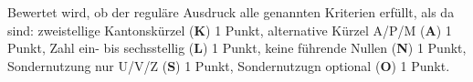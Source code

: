 \begin{bewertung}
Bewertet wird, ob der reguläre Ausdruck alle genannten Kriterien 
erfüllt, als da sind:
zweistellige Kantonskürzel ({\bf K}) 1 Punkt,
alternative Kürzel A/P/M ({\bf A}) 1 Punkt,
Zahl ein- bis sechsstellig ({\bf L}) 1 Punkt,
keine führende Nullen ({\bf N}) 1 Punkt,
Sondernutzung nur U/V/Z ({\bf S}) 1 Punkt,
Sondernutzugn optional ({\bf O}) 1 Punkt.
\end{bewertung}

